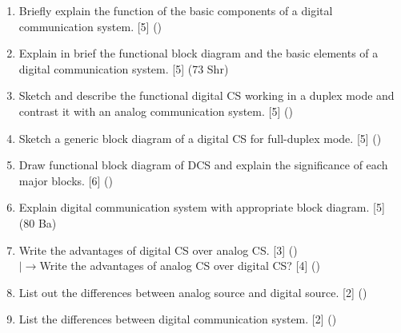 \documentclass[12pt]{article}
\newcommand{\lb}{\\$\left|\rightarrow\right.$}
\begin{document}
\begin{enumerate}[topsep=0pt, noitemsep]
        \item Briefly explain the function of the basic components of a digital communication system. \hfill [5] ()
        
        \item Explain in brief the functional block diagram and the basic elements of a digital communication system. \hfill [5] (73 Shr)

        \item Sketch and describe the functional digital CS working in a duplex mode and contrast it with an analog communication system. \hfill [5] ()

        \item Sketch a generic block diagram of a digital CS for full-duplex mode. \hfill [5] ()
        
        \item Draw functional block diagram of DCS and explain the significance of each major blocks. \hfill [6] ()
        
        \item Explain digital communication system with appropriate block diagram. \hfill [5] (80 Ba)

        \item Write the advantages of digital CS over analog CS. \hfill [3] ()
        \lb Write the advantages of analog CS over digital CS? \hfill [4] ()

        \item List out the differences between analog source and digital source. \hfill [2] ()
        
        \item List the differences between digital communication system. \hfill [2] ()
      \end{enumerate}
\end{document}
